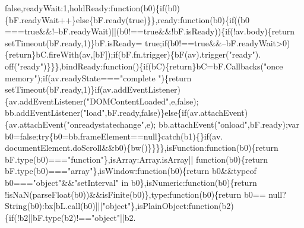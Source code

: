 \begin{DoxyCode}
{      false},readyWait:1,holdReady:\textcolor{keyword}{function}(b0)\{\textcolor{keywordflow}{if}(b0)\{bF.readyWait++\}\textcolor{keywordflow}{else}\{bF.ready(\textcolor{keyword}{true})\}\},ready:\textcolor{keyword}{function}(b0)\{\textcolor{keywordflow}{if}((b0
      ===\textcolor{keyword}{true}&&!--bF.readyWait)||(b0!==\textcolor{keyword}{true}&&!bF.isReady))\{\textcolor{keywordflow}{if}(!av.body)\{\textcolor{keywordflow}{return} setTimeout(bF.ready,1)\}bF.isReady=\textcolor{keyword}{
      true};\textcolor{keywordflow}{if}(b0!==\textcolor{keyword}{true}&&--bF.readyWait>0)\{\textcolor{keywordflow}{return}\}bC.fireWith(av,[bF]);\textcolor{keywordflow}{if}(bF.fn.trigger)\{bF(av).trigger(\textcolor{stringliteral}{"ready"}).
      off(\textcolor{stringliteral}{"ready"})\}\}\},bindReady:\textcolor{keyword}{function}()\{\textcolor{keywordflow}{if}(bC)\{\textcolor{keywordflow}{return}\}bC=bF.Callbacks(\textcolor{stringliteral}{"once memory"});\textcolor{keywordflow}{if}(av.readyState===\textcolor{stringliteral}{"complete
      "})\{\textcolor{keywordflow}{return} setTimeout(bF.ready,1)\}\textcolor{keywordflow}{if}(av.addEventListener)\{av.addEventListener(\textcolor{stringliteral}{"DOMContentLoaded"},e,\textcolor{keyword}{false});
      bb.addEventListener(\textcolor{stringliteral}{"load"},bF.ready,\textcolor{keyword}{false})\}\textcolor{keywordflow}{else}\{\textcolor{keywordflow}{if}(av.attachEvent)\{av.attachEvent(\textcolor{stringliteral}{"onreadystatechange"},e);
      bb.attachEvent(\textcolor{stringliteral}{"onload"},bF.ready);var b0=\textcolor{keyword}{false};\textcolor{keywordflow}{try}\{b0=bb.frameElement==null\}\textcolor{keywordflow}{catch}(b1)\{\}\textcolor{keywordflow}{if}(av.
      documentElement.doScroll&&b0)\{bw()\}\}\}\},isFunction:\textcolor{keyword}{function}(b0)\{\textcolor{keywordflow}{return} bF.type(b0)===\textcolor{stringliteral}{"function"}\},isArray:Array.isArray||\textcolor{keyword}{
      function}(b0)\{\textcolor{keywordflow}{return} bF.type(b0)===\textcolor{stringliteral}{"array"}\},isWindow:\textcolor{keyword}{function}(b0)\{\textcolor{keywordflow}{return} b0&&typeof b0===\textcolor{stringliteral}{"object"}&&\textcolor{stringliteral}{"setInterval"}
       in b0\},isNumeric:\textcolor{keyword}{function}(b0)\{\textcolor{keywordflow}{return} !isNaN(parseFloat(b0))&&isFinite(b0)\},type:\textcolor{keyword}{function}(b0)\{\textcolor{keywordflow}{return} b0==
      null?String(b0):bx[bL.call(b0)]||\textcolor{stringliteral}{"object"}\},isPlainObject:function(b2)\{\textcolor{keywordflow}{if}(!b2||bF.type(b2)!==\textcolor{stringliteral}{"object"}||b2.

\end{DoxyCode}
